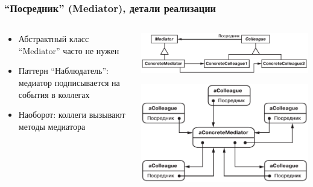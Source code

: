 \documentclass[xetex,mathserif,serif]{beamer}
\begin{document}
	\begin{frame}
		\frametitle{``Посредник'' (Mediator), детали реализации}
		\begin{columns}
			\begin{column}{0.5\textwidth}
				\begin{itemize}
					\item Абстрактный класс ``Mediator'' часто не нужен
					\item Паттерн ``Наблюдатель'': медиатор подписывается на события в коллегах
					\item Наоборот: коллеги вызывают методы медиатора
				\end{itemize}
			\end{column}
			\begin{column}{0.5\textwidth}
				\begin{center}
					\includegraphics[width=\textwidth]{mediatorClasses.png}

					\includegraphics[width=\textwidth]{mediatorObjects.png}
				\end{center}
			\end{column}
		\end{columns}
	\end{frame}
\end{document}
